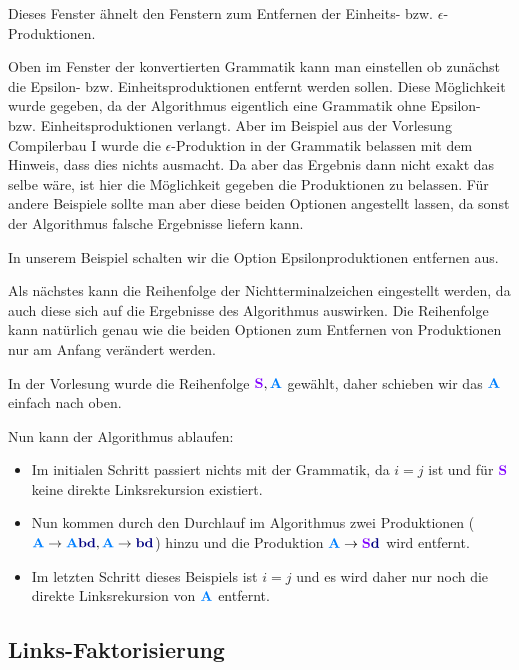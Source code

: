 Dieses Fenster ähnelt den Fenstern zum Entfernen der Einheits- bzw. $\epsilon$-Produktionen.

Oben im Fenster der konvertierten Grammatik kann man einstellen ob zunächst die Epsilon- bzw. Einheitsproduktionen entfernt werden sollen. Diese Möglichkeit wurde gegeben, da der Algorithmus eigentlich eine Grammatik ohne Epsilon- bzw. Einheitsproduktionen verlangt. Aber im Beispiel aus der Vorlesung Compilerbau I wurde die $\epsilon$-Produktion in der Grammatik belassen mit dem Hinweis, dass dies nichts ausmacht. Da aber das Ergebnis dann nicht exakt das selbe wäre, ist hier die Möglichkeit gegeben die Produktionen zu belassen. Für andere Beispiele sollte man aber diese beiden Optionen angestellt lassen, da sonst der Algorithmus falsche Ergebnisse liefern kann.

In unserem Beispiel schalten wir die Option Epsilonproduktionen entfernen aus.

Als nächstes kann die Reihenfolge der Nichtterminalzeichen eingestellt werden, da auch diese sich auf die Ergebnisse des Algorithmus auswirken. Die Reihenfolge kann natürlich genau wie die beiden Optionen zum Entfernen von Produktionen nur am Anfang verändert werden.

In der Vorlesung wurde die Reihenfolge $\StartSymbol{S}, \NonterminalSymbol{A}$ gewählt, daher schieben wir das $\NonterminalSymbol{A}$ einfach nach oben.

Nun kann der Algorithmus ablaufen:

\begin{itemize}
  \item Im initialen Schritt passiert nichts mit der Grammatik, da $i = j$ ist und für $\StartSymbol{S}$ keine direkte Linksrekursion existiert.
  \item Nun kommen durch den Durchlauf im Algorithmus zwei Produktionen ($\NonterminalSymbol{A} \to \NonterminalSymbol{A}\TerminalSymbol{b}\TerminalSymbol{d},\NonterminalSymbol{A} \to \TerminalSymbol{b}\TerminalSymbol{d}$) hinzu und die Produktion $\NonterminalSymbol{A} \to \StartSymbol{S}\TerminalSymbol{d}$ wird entfernt.
  \item Im letzten Schritt dieses Beispiels ist $i = j$ und es wird daher nur noch die direkte Linksrekursion von $\NonterminalSymbol{A}$ entfernt.
\end{itemize}

\subsection{Links-Faktorisierung}


